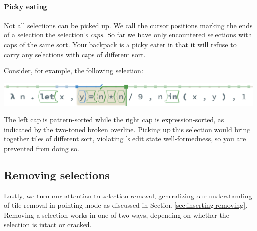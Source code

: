 

\paragraph{Picky eating}
Not all selections can be picked up.
We call the cursor positions marking the ends of a selection
the selection's \emph{caps}.
So far we have only encountered selections with caps
of the same sort.
Your backpack is a picky eater in that
it will refuse to carry any selections with caps of
different sort.

Consider, for example, the following selection:

\begin{center}
  \includegraphics[width=\columnwidth]{img/broken-overline.png}
\end{center}


\noindent
The left cap is pattern-sorted while the right cap
is expression-sorted, as indicated by the two-toned
broken overline.
Picking up this selection would bring together
tiles of different sort, violating \tylr's edit
state well-formedness, so you are prevented from doing so.



\subsection{Removing selections}

Lastly, we turn our attention to selection removal,
generalizing our understanding of tile removal
in pointing mode as discussed in
Section \ref{sec:inserting-removing}.
Removing a selection works in one of two ways,
depending on whether the selection is intact or cracked.

